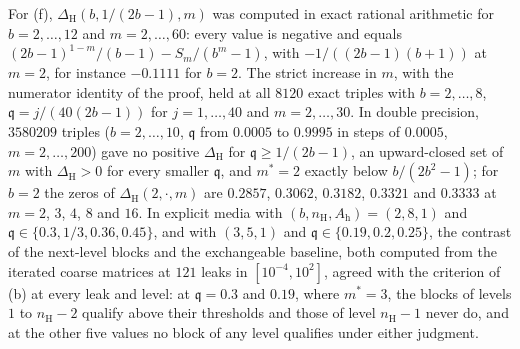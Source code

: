 \begin{numcheck}
For (f), $\Delta_{\mathrm H}(b,1/(2b-1),m)$ was computed in exact rational arithmetic for $b=2,\dots,12$ and $m=2,\dots,60$: every value is negative and equals $(2b-1)^{1-m}/(b-1)-S_m/(b^m-1)$, with $-1/((2b-1)(b+1))$ at $m=2$, for instance $-0.1111$ for $b=2$. The strict increase in $m$, with the numerator identity of the proof, held at all $8120$ exact triples with $b=2,\dots,8$, $\mathfrak q=j/(40(2b-1))$ for $j=1,\dots,40$ and $m=2,\dots,30$. In double precision, $3580209$ triples ($b=2,\dots,10$, $\mathfrak q$ from $0.0005$ to $0.9995$ in steps of $0.0005$, $m=2,\dots,200$) gave no positive $\Delta_{\mathrm H}$ for $\mathfrak q\ge1/(2b-1)$, an upward-closed set of $m$ with $\Delta_{\mathrm H}>0$ for every smaller $\mathfrak q$, and $m^\ast=2$ exactly below $b/(2b^2-1)$; for $b=2$ the zeros of $\Delta_{\mathrm H}(2,\cdot,m)$ are $0.2857$, $0.3062$, $0.3182$, $0.3321$ and $0.3333$ at $m=2$, $3$, $4$, $8$ and $16$. In explicit media with $(b,n_{\mathrm H},A_{\mathrm h})=(2,8,1)$ and $\mathfrak q\in\{0.3,1/3,0.36,0.45\}$, and with $(3,5,1)$ and $\mathfrak q\in\{0.19,0.2,0.25\}$, the contrast of the next-level blocks and the exchangeable baseline, both computed from the iterated coarse matrices at $121$ leaks in $[10^{-4},10^2]$, agreed with the criterion of (b) at every leak and level: at $\mathfrak q=0.3$ and $0.19$, where $m^\ast=3$, the blocks of levels $1$ to $n_{\mathrm H}-2$ qualify above their thresholds and those of level $n_{\mathrm H}-1$ never do, and at the other five values no block of any level qualifies under either judgment.
\end{numcheck}

